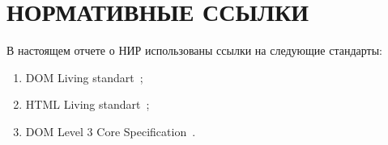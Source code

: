 \section*{НОРМАТИВНЫЕ ССЫЛКИ}

В настоящем отчете о НИР использованы ссылки на следующие стандарты:

\begin{enumerate}[label=\arabic*)]
	\item DOM Living standart~\cite{dom-doc};
	\item HTML Living standart~\cite{html-doc};
	\item DOM Level 3 Core Specification~\cite{not-dynamic}.
	
\end{enumerate}

\pagebreak